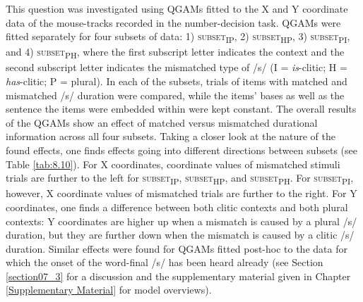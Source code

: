 This question was investigated using QGAMs fitted to the X and Y coordinate data of the mouse-tracks recorded in the number-decision task. QGAMs were fitted separately for four subsets of data: 1) \textsc{subset\textsubscript{IP}}, 2) \textsc{subset\textsubscript{HP}}, 3) \textsc{subset\textsubscript{PI}}, and 4) \textsc{subset\textsubscript{PH}}, where the first subscript letter indicates the context and the second subscript letter indicates the mismatched type of /s/ (I = \textit{is}-clitic; H = \textit{has}-clitic; P = plural). In each of the subsets, trials of items with matched and mismatched /s/ duration were compared, while the items’ bases as well as the sentence the items were embedded within were kept constant. The overall results of the QGAMs show an effect of matched versus mismatched durational information across all four subsets. Taking a closer look at the nature of the found effects, one finds effects going into different directions between subsets (see Table \ref{tab:8.10}). For X coordinates, coordinate values of mismatched stimuli trials are further to the left for \textsc{subset\textsubscript{IP}}, \textsc{subset\textsubscript{HP}}, and \textsc{subset\textsubscript{PH}}. For \textsc{subset\textsubscript{PI}}, however, X coordinate values of mismatched trials are further to the right. For Y coordinates, one finds a difference between both clitic contexts and both plural contexts: Y coordinates are higher up when a mismatch is caused by a plural /s/ duration, but they are further down when the mismatch is caused by a clitic /s/ duration. Similar effects were found for QGAMs fitted post-hoc to the data for which the onset of the word-final /s/ has been heard already (see Section \ref{section07_3} for a discussion and the supplementary material given in Chapter \ref{Supplementary Material} for model overviews).

